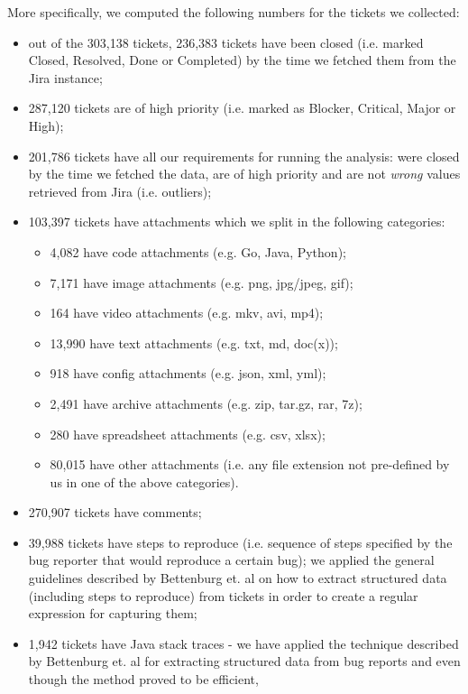 \documentclass{mpaper}
\begin{document}
More specifically, we computed the following numbers for the tickets we collected:
\begin{itemize}
  \item out of the 303,138 tickets, 236,383 tickets have been closed (i.e. marked Closed, Resolved, Done or Completed) by the time we 
  fetched them from the Jira instance;
  \item 287,120 tickets are of high priority (i.e. marked as Blocker, Critical, Major or High);
  \item 201,786 tickets have all our requirements for running the analysis: were closed by the time we fetched the data, 
  are of high priority and are not \emph{wrong} values retrieved from Jira (i.e. outliers);
  \item 103,397 tickets have attachments which we split in the following categories:
    \begin{itemize}
      \item 4,082 have code attachments (e.g. Go, Java, Python);
      \item 7,171 have image attachments (e.g. png, jpg/jpeg, gif);
      \item 164 have video attachments (e.g. mkv, avi, mp4);
      \item 13,990 have text attachments (e.g. txt, md, doc(x));
      \item 918 have config attachments (e.g. json, xml, yml);
      \item 2,491 have archive attachments (e.g. zip, tar.gz, rar, 7z);
      \item 280 have spreadsheet attachments (e.g. csv, xlsx);
      \item 80,015 have other attachments (i.e. any file extension not pre-defined by us in one of the above categories).
    \end{itemize}
  \item 270,907 tickets have comments;
  \item 39,988 tickets have steps to reproduce (i.e. sequence of steps specified by the bug reporter that would reproduce a certain bug); 
  we applied the general guidelines described by Bettenburg et. al \cite{bettenburg2008extracting} on how to extract structured 
  data (including steps to reproduce) from tickets in order to create a regular expression for capturing them;
  \item 1,942 tickets have Java stack traces - we have applied the technique described by Bettenburg et. al 
  \cite{bettenburg2008extracting} for extracting structured data from bug reports and even though the method proved to be efficient, 

\end{itemize}
\end{document}
